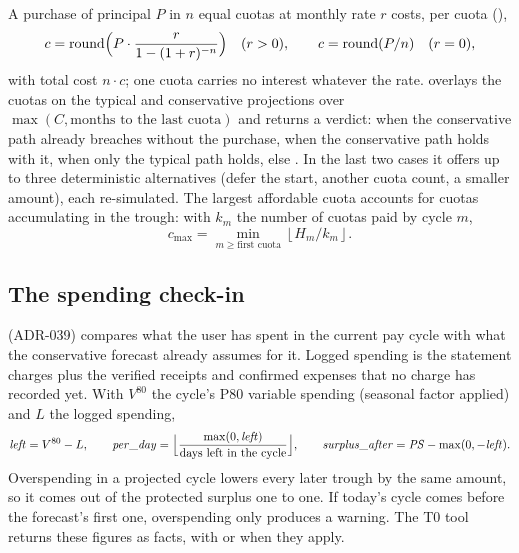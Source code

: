 A purchase of principal $P$ in $n$ equal cuotas at monthly rate $r$ costs, per cuota (),
\begin{equation}
  c = \operatorname{round}\Bigl(P \cdot \frac{r}{1 - (1 + r)^{-n}}\Bigr) \quad (r > 0), \qquad c = \operatorname{round}(P / n) \quad (r = 0),
\end{equation}
with total cost $n \cdot c$; one cuota carries no interest whatever the rate.  overlays the
cuotas on the typical and conservative projections over $\max(C, \text{months to the last cuota})$ and returns a
verdict:  when the conservative path already breaches without the purchase, 
when the conservative path holds with it,  when only the typical path holds, else
. In the last two cases it offers up to three deterministic alternatives (defer the start, another
cuota count, a smaller amount), each re-simulated. The largest affordable cuota accounts for cuotas accumulating in
the trough: with $k_m$ the number of cuotas paid by cycle $m$,
\begin{equation}
  c_{\max} = \min_{m \geq \text{first cuota}} \left\lfloor H_m / k_m \right\rfloor .
\end{equation}

\subsection{The spending check-in}\label{sec:spending}

 (ADR-039) compares what the user has spent in the current pay cycle with what the
conservative forecast already assumes for it. Logged spending is the statement charges plus the verified receipts
and confirmed expenses that no charge has recorded yet. With $V^{80}$ the cycle's P80 variable spending (seasonal
factor applied) and $L$ the logged spending,
\begin{equation}
  \mathit{left} = V^{80} - L, \qquad \mathit{per\_day} = \Bigl\lfloor \frac{\max(0, \mathit{left})}{\text{days left in the cycle}} \Bigr\rfloor, \qquad \mathit{surplus\_after} = \mathit{PS} - \max(0, -\mathit{left}).
\end{equation}
Overspending in a projected cycle lowers every later trough by the same amount, so it comes out of the protected
surplus one to one. If today's cycle comes before the forecast's first one, overspending only produces a warning. The
T0 tool  returns these figures as facts, with  or
 when they apply.

